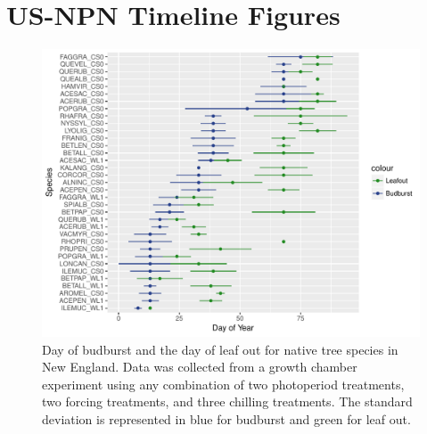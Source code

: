 \documentclass{article}\usepackage[]{graphicx}\usepackage[]{color}
\begin{document}
\renewcommand{\thetable}{\arabic{table}}
\renewcommand{\thefigure}{\arabic{figure}}
\renewcommand{\labelitemi}{$-$}
\section*{US-NPN Timeline Figures}

\begin{figure} [H]
\begin{center}
\caption{Day of budburst and the day of leaf out for native tree species in New England. Data was collected from a growth chamber experiment using any combination of two photoperiod treatments, two forcing treatments, and three chilling treatments. The standard deviation is represented in blue for budburst and green for leaf out. }
\includegraphics{..//output/Dan_TXandSp.pdf} 
\end{center}
\end{figure}
\end{document}

